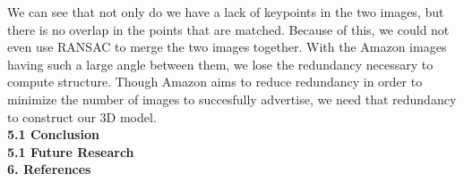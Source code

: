 \documentclass[12pt]{article}
\begin{document}
\begin{multicols}{2}
We can see that not only do we have a lack of keypoints in the two images, but there is no overlap in the points that are matched. Because of this, we could not even use RANSAC to merge the two images together. With the Amazon images having such a large angle between them, we lose the redundancy necessary to compute structure. Though Amazon aims to reduce redundancy in order to minimize the number of images to succesfully advertise, we need that redundancy to construct our 3D model.\\
{\large \textbf{5.1 Conclusion}}\\
{\large \textbf{5.1 Future Research}}\\
{\large \textbf{6. References}}\\

\end{multicols}
\end{document}
